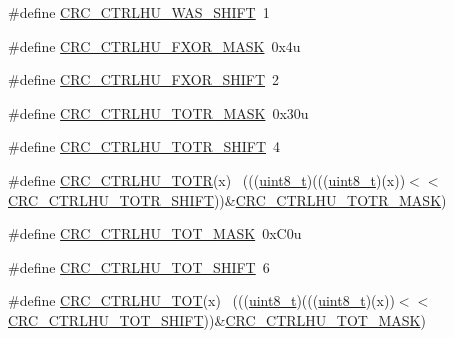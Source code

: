 \begin{DoxyCompactItemize}
\#define \hyperlink{group___c_r_c___register___masks_gacd050b23263379193cf9cde3e1567ab1}{C\+R\+C\+\_\+\+C\+T\+R\+L\+H\+U\+\_\+\+W\+A\+S\+\_\+\+S\+H\+I\+FT}~1
\item 
\#define \hyperlink{group___c_r_c___register___masks_ga0a552f60712b28cd96e939d4324157df}{C\+R\+C\+\_\+\+C\+T\+R\+L\+H\+U\+\_\+\+F\+X\+O\+R\+\_\+\+M\+A\+SK}~0x4u
\item 
\#define \hyperlink{group___c_r_c___register___masks_ga505ca51d1aad1610b44bad4580f2637f}{C\+R\+C\+\_\+\+C\+T\+R\+L\+H\+U\+\_\+\+F\+X\+O\+R\+\_\+\+S\+H\+I\+FT}~2
\item 
\#define \hyperlink{group___c_r_c___register___masks_ga0418249380c6e69fc9a949f8da4e60f1}{C\+R\+C\+\_\+\+C\+T\+R\+L\+H\+U\+\_\+\+T\+O\+T\+R\+\_\+\+M\+A\+SK}~0x30u
\item 
\#define \hyperlink{group___c_r_c___register___masks_ga991fefda83335d188d0cc82f1e64f43e}{C\+R\+C\+\_\+\+C\+T\+R\+L\+H\+U\+\_\+\+T\+O\+T\+R\+\_\+\+S\+H\+I\+FT}~4
\item 
\#define \hyperlink{group___c_r_c___register___masks_ga90b299bcced60b8b784350afac4da6dc}{C\+R\+C\+\_\+\+C\+T\+R\+L\+H\+U\+\_\+\+T\+O\+TR}(x)                                          ~(((\hyperlink{_p_e___types_8h_aba7bc1797add20fe3efdf37ced1182c5}{uint8\+\_\+t})(((\hyperlink{_p_e___types_8h_aba7bc1797add20fe3efdf37ced1182c5}{uint8\+\_\+t})(x))$<$$<$\hyperlink{group___c_r_c___register___masks_ga991fefda83335d188d0cc82f1e64f43e}{C\+R\+C\+\_\+\+C\+T\+R\+L\+H\+U\+\_\+\+T\+O\+T\+R\+\_\+\+S\+H\+I\+FT}))\&\hyperlink{group___c_r_c___register___masks_ga0418249380c6e69fc9a949f8da4e60f1}{C\+R\+C\+\_\+\+C\+T\+R\+L\+H\+U\+\_\+\+T\+O\+T\+R\+\_\+\+M\+A\+SK})
\item 
\#define \hyperlink{group___c_r_c___register___masks_gac2999b1c162cd0860f76f002ead704ad}{C\+R\+C\+\_\+\+C\+T\+R\+L\+H\+U\+\_\+\+T\+O\+T\+\_\+\+M\+A\+SK}~0x\+C0u
\item 
\#define \hyperlink{group___c_r_c___register___masks_ga079a05fc69d357e3fadfb07de8abbeee}{C\+R\+C\+\_\+\+C\+T\+R\+L\+H\+U\+\_\+\+T\+O\+T\+\_\+\+S\+H\+I\+FT}~6
\item 
\#define \hyperlink{group___c_r_c___register___masks_ga7ac4af4df4f785bf6205fd8e6118f28b}{C\+R\+C\+\_\+\+C\+T\+R\+L\+H\+U\+\_\+\+T\+OT}(x)                                            ~(((\hyperlink{_p_e___types_8h_aba7bc1797add20fe3efdf37ced1182c5}{uint8\+\_\+t})(((\hyperlink{_p_e___types_8h_aba7bc1797add20fe3efdf37ced1182c5}{uint8\+\_\+t})(x))$<$$<$\hyperlink{group___c_r_c___register___masks_ga079a05fc69d357e3fadfb07de8abbeee}{C\+R\+C\+\_\+\+C\+T\+R\+L\+H\+U\+\_\+\+T\+O\+T\+\_\+\+S\+H\+I\+FT}))\&\hyperlink{group___c_r_c___register___masks_gac2999b1c162cd0860f76f002ead704ad}{C\+R\+C\+\_\+\+C\+T\+R\+L\+H\+U\+\_\+\+T\+O\+T\+\_\+\+M\+A\+SK})

\end{DoxyCompactItemize}
